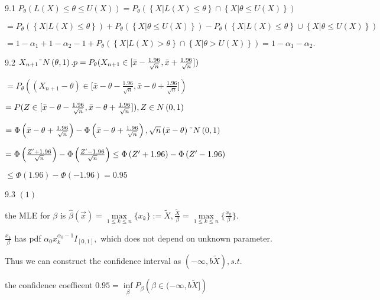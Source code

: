 \documentclass{article}
\begin{document}
9.1 $P_{\theta }\left( L\left( X\right) \leq \theta \leq U\left( X\right)
\right) =P_{\theta }\left( \left\{ X|L\left( X\right) \leq \theta \right\}
\cap \left\{ X|\theta \leq U\left( X\right) \right\} \right) $

$=P_{\theta }\left( \left\{ X|L\left( X\right) \leq \theta \right\} \right)
+P_{\theta }\left( \left\{ X|\theta \leq U\left( X\right) \right\} \right)
-P_{\theta }\left( \left\{ X|L\left( X\right) \leq \theta \right\} \cup
\left\{ X|\theta \leq U\left( X\right) \right\} \right) $

$=1-\alpha _{1}+1-\alpha _{2}-1+P_{\theta }\left( \left\{ X|L\left( X\right)
>\theta \right\} \cap \left\{ X|\theta >U\left( X\right) \right\} \right)
=1-\alpha _{1}-\alpha _{2}.$

9.2 $X_{n+1}\symbol{126}N\left( \theta ,1\right) .p=P_{\theta }(X_{n+1}\in
\lbrack \bar{x}-\frac{1.96}{\sqrt{n}},\bar{x}+\frac{1.96}{\sqrt{n}}])$

$=P_{\theta }(\left( X_{n+1}-\theta \right) \in \lbrack \bar{x}-\theta -%
\frac{1.96}{\sqrt{n}},\bar{x}-\theta +\frac{1.96}{\sqrt{n}}])$

$=P(Z\in \lbrack \bar{x}-\theta -\frac{1.96}{\sqrt{n}},\bar{x}-\theta +\frac{%
1.96}{\sqrt{n}}]),Z\in N\left( 0,1\right) $

$=\Phi \left( \bar{x}-\theta +\frac{1.96}{\sqrt{n}}\right) -\Phi \left( \bar{%
x}-\theta +\frac{1.96}{\sqrt{n}}\right) ,\sqrt{n}\left( \bar{x}-\theta
\right) \symbol{126}N\left( 0,1\right) $

$=\Phi \left( \frac{Z^{\prime }+1.96}{\sqrt{n}}\right) -\Phi \left( \frac{%
Z^{\prime }-1.96}{\sqrt{n}}\right) \leq \Phi \left( Z^{\prime }+1.96\right)
-\Phi \left( Z^{\prime }-1.96\right) $

$\leq \Phi \left( 1.96\right) -\Phi \left( -1.96\right) =0.95$

9.3 $\left( 1\right) $

the MLE for $\beta $ is $\hat{\beta}\left( \vec{x}\right) =\underset{1\leq
k\leq n}{\max }\{x_{k}\}:=\tilde{X},\frac{\tilde{X}}{\beta }=\underset{1\leq
k\leq n}{\max }\{\frac{x_{k}}{\beta }\}.$

$\frac{x_{k}}{\beta }$ has pdf $\alpha _{0}x_{k}^{\alpha _{0}-1}I_{[0,1]},$
which does not depend on unknown parameter.

Thus we can construct the confidence interval as $\left( -\infty ,b\tilde{X}%
\right) ,s.t.$

the confidence coefficent $0.95=\underset{\beta }{\inf }P_{\beta }\left(
\beta \in (-\infty ,b\tilde{X}]\right) $ 
\end{document}
